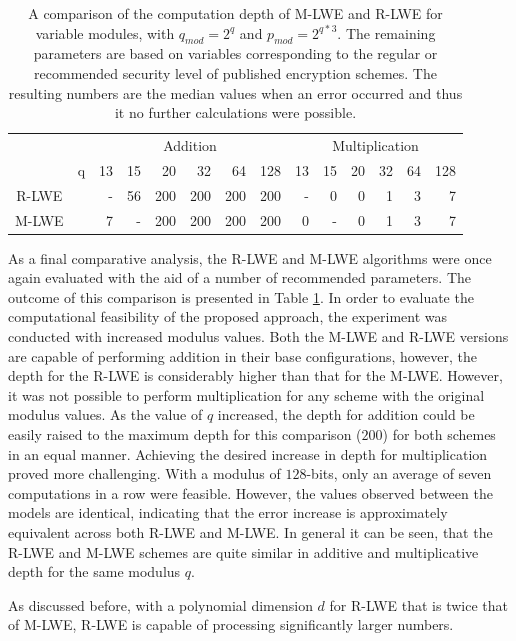 \begin{table}[h]
  \centering
  \caption[M-LWE and R-LWE computation depth comparison]{A comparison of the computation depth of M-LWE and R-LWE for variable modules, with $q_{mod} = 2^q$ and $p_{mod}=2^{q*3}$. The remaining parameters are based on variables corresponding to the regular or recommended security level of published encryption schemes. The resulting numbers are the median values when an error occurred and thus it no further calculations were possible.}
  
  \begin{tabular}{|cc|rrrrrr|rrrrrr|}
    \toprule
                                       &   & \multicolumn{6}{|c|}{Addition} & \multicolumn{6}{|c|}{Multiplication}                                                        \\
                                       & q & 13                             & 15                                   & 20  & 32  & 64  & 128 & 13 & 15 & 20 & 32 & 64 & 128 \\
    \midrule
    R-LWE  \cite{CyrstalsKyber}        &   & -                              & 56                                   & 200 & 200 & 200 & 200 & -  & 0  & 0  & 1  & 3  & 7   \\
    M-LWE  \cite{PracticalKeyExchange} &   & 7                              & -                                    & 200 & 200 & 200 & 200 & 0  & -  & 0  & 1  & 3  & 7   \\
    \bottomrule
  \end{tabular}
  \label{table:depthComparison}
\end{table}

As a final comparative analysis, the R-LWE and M-LWE algorithms were once again evaluated with the aid of a number of recommended parameters. The outcome of this comparison is presented in Table \ref{table:depthComparison}. In order to evaluate the computational feasibility of the proposed approach, the experiment was conducted with increased modulus values. Both the M-LWE and R-LWE versions are capable of performing addition in their base configurations, however, the depth for the R-LWE is considerably higher than that for the M-LWE. However, it was not possible to perform multiplication for any scheme with the original modulus values. As the value of $q$ increased, the depth for addition could be easily raised to the maximum depth for this comparison ($200$) for both schemes in an equal manner. Achieving the desired increase in depth for multiplication proved more challenging. With a modulus of $128$-bits, only an average of seven computations in a row were feasible. However, the values observed between the models are identical, indicating that the error increase is approximately equivalent across both R-LWE and M-LWE. In general it can be seen, that the R-LWE and M-LWE schemes are quite similar in additive and multiplicative depth for the same modulus $q$.

As discussed before, with a polynomial dimension $d$ for R-LWE that is twice that of M-LWE, R-LWE is capable of processing significantly larger numbers.

